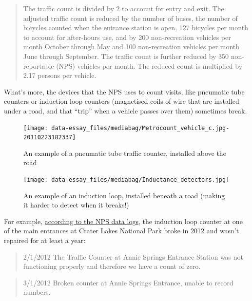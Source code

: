 \documentclass[
  letterpaper,
  DIV=11,
  numbers=noendperiod]{scrartcl}
\begin{document}
\begin{quote}
The traffic count is divided by 2 to account for entry and exit. The
adjusted traffic count is reduced by the number of buses, the number of
bicycles counted when the entrance station is open, 127 bicycles per
month to account for after-hours use, and by 200 non-recreation vehicles
per month October through May and 100 non-recreation vehicles per month
June through September. The traffic count is further reduced by 350
non-reportable (NPS) vehicles per month. The reduced count is multiplied
by 2.17 persons per vehicle.
\end{quote}

What's more, the devices that the NPS uses to count visits, like
pneumatic tube counters or induction loop counters (magnetised coils of
wire that are installed under a road, and that ``trip'' when a vehicle
passes over them) sometimes break.

\begin{figure}[H]

{\centering \texttt{[image: data-essay\_files/mediabag/Metrocount\_vehicle\_c.jpg-20110223182337]}

}

\caption{An example of a pneumatic tube traffic counter, installed above
the road}

\end{figure}%
\begin{figure}[H]

{\centering \texttt{[image: data-essay\_files/mediabag/Inductance\_detectors.jpg]}

}

\caption{An example of an induction loop, installed beneath a road
(making it harder to detect when it breaks!)}

\end{figure}%

For example,
\href{https://irma.nps.gov/Stats/SSRSReports/Park\%20Specific\%20Reports/Monthly\%20Visitation\%20Comments\%20By\%20Park?Park=CRLA}{according
to the NPS data logs}, the induction loop counter at one of the main
entrances at Crater Lakes National Park broke in 2012 and wasn't
repaired for at least a year:

\begin{quote}
2/1/2012 \textbar{} The Traffic Counter at Annie Springs Entrance
Station was not functioning properly and therefore we have a count of
zero.
\end{quote}

\begin{quote}
3/1/2012 \textbar{} Broken counter at Annie Springs Entrance, unable to
record numbers.
\end{quote}
\end{document}
